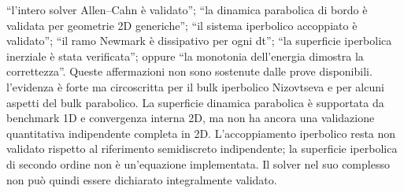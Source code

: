 {} “l’intero solver Allen–Cahn è validato”; “la dinamica parabolica di bordo è validata per geometrie 2D generiche”; “il sistema iperbolico accoppiato è validato”; “il ramo Newmark è dissipativo per ogni dt”; “la superficie iperbolica inerziale è stata verificata”; oppure “la monotonia dell’energia dimostra la correttezza”. Queste affermazioni non sono sostenute dalle prove disponibili.\markdownRendererInterblockSeparator
{} l’evidenza è forte ma circoscritta per il bulk iperbolico Nizovtseva e per alcuni aspetti del bulk parabolico. La superficie dinamica parabolica è supportata da benchmark 1D e convergenza interna 2D, ma non ha ancora una validazione quantitativa indipendente completa in 2D. L’accoppiamento iperbolico resta non validato rispetto al riferimento semidiscreto indipendente; la superficie iperbolica di secondo ordine non è un’equazione implementata. Il solver nel suo complesso non può quindi essere dichiarato integralmente validato.
\markdownRendererSectionEnd 
\markdownRendererSectionEnd \markdownRendererDocumentEnd
